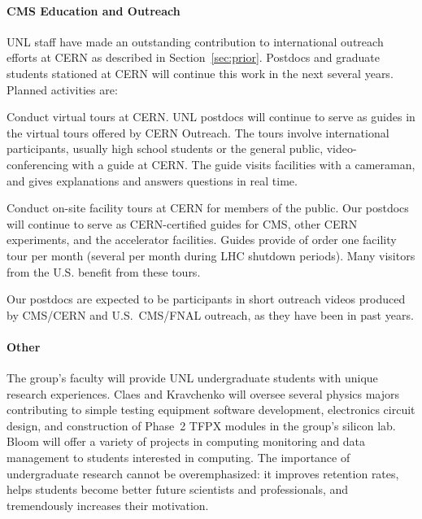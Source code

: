 \paragraph{CMS Education and Outreach}
UNL staff have made an outstanding contribution to international outreach
efforts at CERN as described in Section~\ref{sec:prior}.
Postdocs and graduate students stationed at CERN will continue this work in the
next several years. Planned activities are:
\begin{packed_itemize}

     \item Conduct virtual tours at CERN.  UNL
   	postdocs will continue to serve as guides in the virtual tours offered by CERN
       Outreach. The tours involve international participants, usually high school
       students or the general public, video-conferencing with a guide at CERN.
       The guide visits facilities with a cameraman, and gives
       explanations and answers questions in real time.

     \item Conduct on-site facility tours at CERN for members of the public. Our postdocs will continue to serve as CERN-certified guides for CMS,
       other CERN experiments, and the accelerator facilities. Guides provide of order one facility tour per month (several per month during
       LHC shutdown periods). Many visitors from the U.S. benefit from these tours.

   \item Our postdocs are expected to be participants in short outreach videos
       produced by CMS/CERN and U.S.~CMS/FNAL outreach, as they have been in past years.
\end{packed_itemize}

\paragraph{Other} The group's faculty will provide UNL undergraduate students with unique research experiences. Claes and Kravchenko will oversee several physics majors contributing to simple testing equipment software development, electronics circuit design, and construction of Phase~2 TFPX modules in the group's silicon lab.
Bloom will offer a variety of projects in computing monitoring and data management to students interested in computing.
The importance of undergraduate research cannot be overemphasized: it improves retention rates, helps students become better future 
scientists and professionals, and tremendously increases their motivation.

